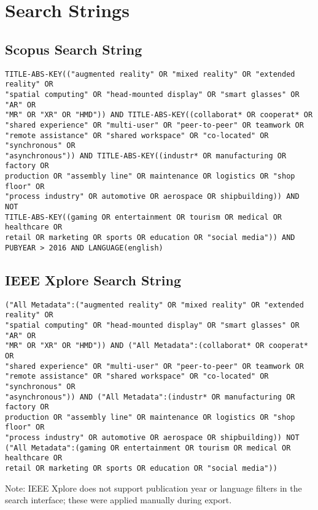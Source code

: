 \section{Search Strings}
\label{appendix:search-strings}

\subsection{Scopus Search String}

\begin{verbatim}
TITLE-ABS-KEY(("augmented reality" OR "mixed reality" OR "extended reality" OR 
"spatial computing" OR "head-mounted display" OR "smart glasses" OR "AR" OR 
"MR" OR "XR" OR "HMD")) AND TITLE-ABS-KEY((collaborat* OR cooperat* OR 
"shared experience" OR "multi-user" OR "peer-to-peer" OR teamwork OR 
"remote assistance" OR "shared workspace" OR "co-located" OR "synchronous" OR 
"asynchronous")) AND TITLE-ABS-KEY((industr* OR manufacturing OR factory OR 
production OR "assembly line" OR maintenance OR logistics OR "shop floor" OR 
"process industry" OR automotive OR aerospace OR shipbuilding)) AND NOT 
TITLE-ABS-KEY((gaming OR entertainment OR tourism OR medical OR healthcare OR 
retail OR marketing OR sports OR education OR "social media")) AND 
PUBYEAR > 2016 AND LANGUAGE(english)
\end{verbatim}

\subsection{IEEE Xplore Search String}

\begin{verbatim}
("All Metadata":("augmented reality" OR "mixed reality" OR "extended reality" OR 
"spatial computing" OR "head-mounted display" OR "smart glasses" OR "AR" OR 
"MR" OR "XR" OR "HMD")) AND ("All Metadata":(collaborat* OR cooperat* OR 
"shared experience" OR "multi-user" OR "peer-to-peer" OR teamwork OR 
"remote assistance" OR "shared workspace" OR "co-located" OR "synchronous" OR 
"asynchronous")) AND ("All Metadata":(industr* OR manufacturing OR factory OR 
production OR "assembly line" OR maintenance OR logistics OR "shop floor" OR 
"process industry" OR automotive OR aerospace OR shipbuilding)) NOT 
("All Metadata":(gaming OR entertainment OR tourism OR medical OR healthcare OR 
retail OR marketing OR sports OR education OR "social media"))
\end{verbatim}

Note: IEEE Xplore does not support publication year or language filters in the search interface; these were applied manually during export.

